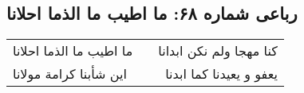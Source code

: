 \begin{center}
\section*{رباعی شماره ۶۸: ما اطیب ما الذما احلانا}
\label{sec:0068}
\begin{longtable}{l p{0.5cm} r}
ما اطیب ما الذما احلانا
&&
کنا مهجا ولم نکن ابدانا
\\
این شأبنا کرامة مولانا
&&
یعفو و یعیدنا کما ابدنا
\\
\end{longtable}
\end{center}
